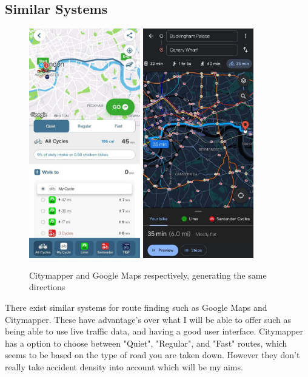 \documentclass[11pt,twoside,a4paper]{article}
\begin{document}
\subsection{Similar Systems}
\begin{figure}[h]
    \begin{center}
        \includegraphics[height=10cm]{citymapper.png}
    \includegraphics[height=10cm]{googlemaps.png}
\end{center}
    \caption{Citymapper and Google Maps respectively, generating the same directions}
    \label{alternatives}
\end{figure}
There exist similar systems for route finding such as Google Maps and Citymapper. These have advantage's over what I will be able to offer such as being able to use live traffic data, and having a good user interface. Citymapper has a option to choose between "Quiet", "Regular", and "Fast" routes, which seems to be based on the type of road you are taken down.
However they don't really take accident density into account which will be my aims.
\end{document}
